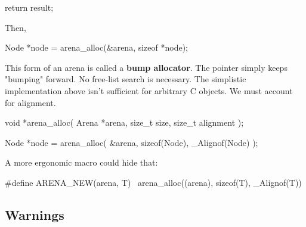 \documentclass{report}
\begin{document}
\begin{itemize}
\begin{cppcode}
{                    return result;
                }
                \end{cppcode}
                \bigbreak \noindent 
                Then,
                \bigbreak \noindent 
                \begin{cppcode}
                Node *node = arena_alloc(&arena, sizeof *node);
                \end{cppcode}
                \bigbreak \noindent 
                This form of an arena is called a \textbf{bump allocator}. The pointer simply keeps "bumping" forward. No free-list search is necessary.
                \bigbreak \noindent 
                The simplistic implementation above isn't sufficient for arbitrary C objects. We must account for alignment.
                \bigbreak \noindent 
                \begin{cppcode}
                    void *arena_alloc(
                        Arena *arena,
                        size_t size,
                        size_t alignment
                    );
                \end{cppcode}
                \bigbreak \noindent 
                \begin{cppcode}
                Node *node = arena_alloc(
                    &arena,
                    sizeof(Node),
                    _Alignof(Node)
                );
                \end{cppcode}
                \bigbreak \noindent 
                A more ergonomic macro could hide that:
                \bigbreak \noindent 
                \begin{cppcode}
                    #define ARENA_NEW(arena, T) \
                        arena_alloc((arena), sizeof(T), _Alignof(T))
                \end{cppcode}


        \end{itemize}

        \pagebreak 
        \subsection{Warnings}
        \begin{itemize}
            
        \end{itemize}















    
\end{document}
